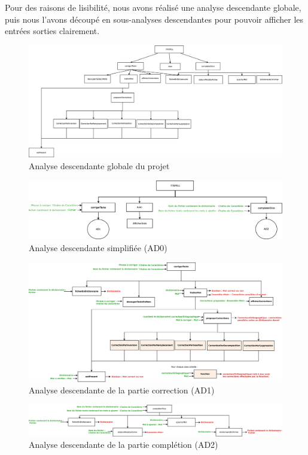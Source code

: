 Pour des raisons de lisibilité, nous avons réalisé une analyse descendante globale, puis nous l'avons découpé en sous-analyses descendantes pour pouvoir afficher les entrées sorties clairement.

\begin{figure}[H]
	\centering 
	\includegraphics[width=\textwidth]{images/AD_globale.eps}
	\caption{Analyse descendante globale du projet}
	\label{fig:ADglobale}
\end{figure}
\begin{figure}[H]
	\centering 
	\includegraphics[width=\textwidth, angle=90, scale = 1.3]{images/AD0.eps}
	\caption{Analyse descendante simplifiée (AD0)}
	\label{fig:AD0}
\end{figure}
\begin{figure}[H]
	\centering 
	\includegraphics[width=\textwidth, angle=90, scale = 1.3]{images/AD1.eps}
	\caption{Analyse descendante de la partie correction (AD1)}
	\label{fig:AD1}
\end{figure}
\begin{figure}[H]
	\centering 
	\includegraphics[width=\textwidth, angle=90, scale = 1.3]{images/AD2.eps}
	\caption{Analyse descendante de la partie complétion (AD2)}
	\label{fig:AD2}
\end{figure}